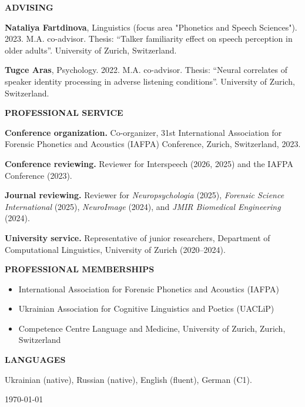 \documentclass[11pt]{article}
\newcommand{\hangpara}{
 \setlength{\parindent}{0in} %
 \hangindent=0.42in %
}
\begin{document}
\vskip 20pt
\begin{flushleft}
{\bf ADVISING}
\end{flushleft}
\hangpara \textbf{Nataliya Fartdinova}, Linguistics (focus area "Phonetics and Speech Sciences"). 2023. M.A. co-advisor. Thesis: “Talker familiarity effect on speech perception in older adults”. University of Zurich, Switzerland.
\vskip 6pt
\hangpara \textbf{Tugce Aras}, Psychology. 2022. M.A. co-advisor. Thesis: “Neural correlates of speaker identity processing in adverse listening conditions”. University of Zurich, Switzerland.


\vskip 20pt
\begin{flushleft}
{\bf PROFESSIONAL SERVICE}
\end{flushleft}
\vskip 6pt
\hangpara
{\bf Conference organization.} Co-organizer, 31st International Association for Forensic Phonetics and Acoustics (IAFPA) Conference, Zurich, Switzerland, 2023.

\vskip 6pt
\hangpara
{\bf Conference reviewing.} Reviewer for Interspeech (2026, 2025) and the IAFPA Conference (2023).
\vskip 6pt
\hangpara
{\bf Journal reviewing.} Reviewer for \textit{Neuropsychologia} (2025), \textit{Forensic Science International} (2025), \textit{NeuroImage} (2024), and \textit{JMIR Biomedical Engineering} (2024).
\vskip 6pt
\hangpara
{\bf University service.} Representative of junior researchers, Department of Computational Linguistics, University of Zurich (2020--2024).


\vskip 20pt
\begin{flushleft}
{\bf PROFESSIONAL MEMBERSHIPS}
\end{flushleft}
\vskip 6pt
\begin{itemize}
\item International Association for Forensic Phonetics and Acoustics (IAFPA)
\item Ukrainian Association for Cognitive Linguistics and Poetics (UACLiP)
\item Competence Centre Language and Medicine, University of Zurich, Zurich, Switzerland
\end{itemize}


\vskip 20pt
\begin{flushleft}
{\bf LANGUAGES}
\end{flushleft}
\vskip 6pt
\hangpara
Ukrainian (native), Russian (native), English (fluent), German (C1).


\vskip 20pt
\today
\end{document}
